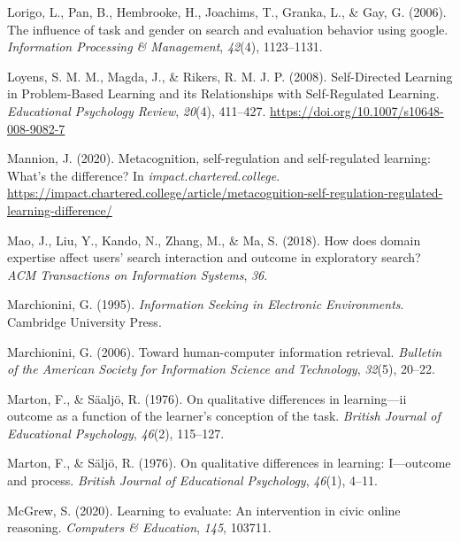 \documentclass[letterpaper, nobind]{templates/ociamthesis}
\newlength{\cslhangindent}
\newenvironment{CSLReferences}[2] %
 {%
  \setlength{\parindent}{0pt}
  \ifodd #1
  \let\oldpar\par
  \def\par{\hangindent=\cslhangindent\oldpar}
  \fi
  \setlength{\parskip}{1mm}
  \setlength{\baselineskip}{6mm}
 }%
 {}
\begin{document}
\begin{CSLReferences}{1}{0}
\leavevmode{}%
Lorigo, L., Pan, B., Hembrooke, H., Joachims, T., Granka, L., \& Gay, G. (2006). The influence of task and gender on search and evaluation behavior using google. \emph{Information Processing \& Management}, \emph{42}(4), 1123--1131.

\leavevmode{}%
Loyens, S. M. M., Magda, J., \& Rikers, R. M. J. P. (2008). Self-{Directed Learning} in {Problem}-{Based Learning} and its {Relationships} with {Self}-{Regulated Learning}. \emph{Educational Psychology Review}, \emph{20}(4), 411--427. \url{https://doi.org/10.1007/s10648-008-9082-7}

\leavevmode{}%
Mannion, J. (2020). Metacognition, self-regulation and self-regulated learning: What's the difference? In \emph{impact.chartered.college}. \url{https://impact.chartered.college/article/metacognition-self-regulation-regulated-learning-difference/}

\leavevmode{}%
Mao, J., Liu, Y., Kando, N., Zhang, M., \& Ma, S. (2018). How does domain expertise affect users' search interaction and outcome in exploratory search? \emph{ACM Transactions on Information Systems}, \emph{36}.

\leavevmode{}%
Marchionini, G. (1995). \emph{Information {Seeking} in {Electronic Environments}}. {Cambridge University Press}.

\leavevmode{}%
Marchionini, G. (2006). Toward human-computer information retrieval. \emph{Bulletin of the American Society for Information Science and Technology}, \emph{32}(5), 20--22.

\leavevmode{}%
Marton, F., \& Säaljö, R. (1976). On qualitative differences in learning---ii outcome as a function of the learner's conception of the task. \emph{British Journal of Educational Psychology}, \emph{46}(2), 115--127.

\leavevmode{}%
Marton, F., \& Säljö, R. (1976). On qualitative differences in learning: I---outcome and process. \emph{British Journal of Educational Psychology}, \emph{46}(1), 4--11.

\leavevmode{}%
McGrew, S. (2020). Learning to evaluate: An intervention in civic online reasoning. \emph{Computers \& Education}, \emph{145}, 103711.


\end{CSLReferences}
\end{document}
